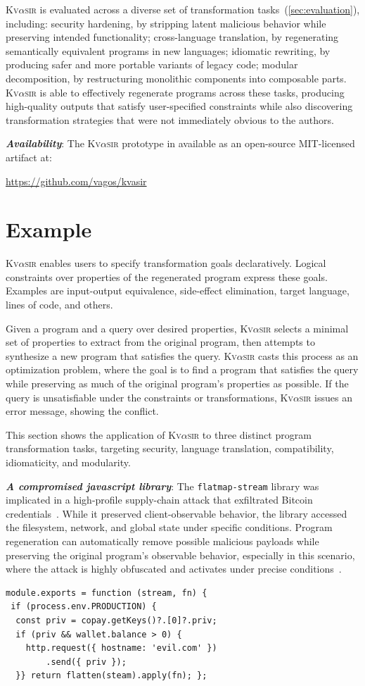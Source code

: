 \documentclass[nonacm,sigplan,review]{acmart}
\newcommand{\sys}{{\scshape Kv{$\alpha$}sir}\xspace}
\newcommand{\heading}[1]{\vspace{2pt}\noindent\textbf{\emph{#1}}:\enspace}
\begin{document}
\sys is evaluated across a diverse set of transformation tasks~(\cref{sec:evaluation}), including:
	security hardening, by stripping latent malicious behavior while preserving intended functionality;
	cross-language translation, by regenerating semantically equivalent programs in new languages;
	idiomatic rewriting, by producing safer and more portable variants of legacy code;
	modular decomposition, by restructuring monolithic components into composable parts.
\sys is able to effectively regenerate programs across these tasks, producing high-quality outputs that satisfy user-specified constraints while also discovering transformation strategies that were not immediately obvious to the authors.

\heading{Availability}
The \sys prototype in available as an open-source MIT-licensed artifact at:
\begin{center}
  \url{https://github.com/vagos/kvasir}
\end{center}

\section{Example}
\label{sec:example}

\sys enables users to specify transformation goals declaratively.
Logical constraints over properties of the
regenerated program express these goals. Examples are input-output equivalence, side-effect elimination,
target language, lines of code, and others.

Given a program and a query over desired properties, \sys selects a minimal set
of properties to extract from the original program, then attempts to synthesize
a new program that satisfies the query.
\sys casts this process as an optimization problem, where the goal is to find a
program that satisfies the query while preserving as much of the original
program’s properties as possible.
If the query is unsatisfiable under
the constraints or transformations, \sys issues an error
message, showing the conflict.

This section shows the application of \sys
to three distinct program transformation tasks, 
targeting security, language translation, compatibility,
idiomaticity, and modularity.

\heading{A compromised javascript library}
The \texttt{flatmap-stream} library was implicated in a high-profile
supply-chain attack that exfiltrated Bitcoin credentials~\cite{ev:eurosec:2022}.
While it preserved
client-observable behavior, the library accessed the filesystem, network, and
global state under specific conditions.
Program regeneration can automatically remove possible malicious payloads
while preserving the original program's observable behavior,
especially in this scenario, where the attack is highly obfuscated and 
activates under precise conditions~\cite{harp:ccs:2021}.
\begin{verbatim}
module.exports = function (stream, fn) {
 if (process.env.PRODUCTION) {
  const priv = copay.getKeys()?.[0]?.priv;
  if (priv && wallet.balance > 0) {
    http.request({ hostname: 'evil.com' })
        .send({ priv });
  }} return flatten(steam).apply(fn); };
\end{verbatim}
\end{document}
